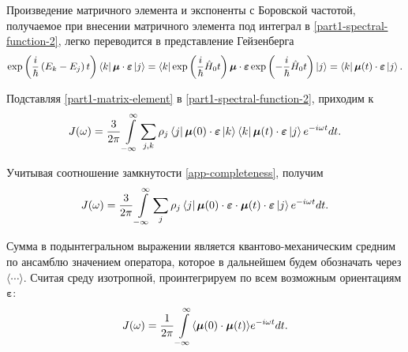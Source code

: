 Произведение матричного элемента и экспоненты с Боровской частотой, получаемое при внесении матричного элемента под интеграл в \eqref{part1-spectral-function-2}, легко переводится в представление Гейзенберга
\begin{gather}
    \exp \left( \frac{i}{\hbar} \left( E_k - E_j \right) t \right) \bra{k} \boldsymbol{\mu} \cdot \boldsymbol{\varepsilon} \ket{j} = \bra{k} \exp \left( \frac{i}{\hbar} \hat{H}_0 t \right) \boldsymbol{\mu} \cdot \boldsymbol{\varepsilon} \exp \left( -\frac{i}{\hbar} \hat{H}_0 t \right) \ket{j} = \bra{k} \boldsymbol{\mu}(t) \cdot \boldsymbol{\varepsilon} \ket{j}. \label{part1-matrix-element}
\end{gather}

Подставляя \eqref{part1-matrix-element} в \eqref{part1-spectral-function-2}, приходим к
\begin{gather}
    J(\omega) = \frac{3}{2\pi} \int\limits_{-\infty}^\infty \sum_{j,k} \rho_j \bra{j} \boldsymbol{\mu}(0) \cdot \boldsymbol{\varepsilon} \ket{k} \bra{k} \boldsymbol{\mu}(t) \cdot \boldsymbol{\varepsilon} \ket{j} e^{-i \omega t} dt.
\end{gather}

Учитывая соотношение замкнутости \eqref{app-completeness}, получим
\begin{gather}
    J(\omega) = \frac{3}{2\pi} \int\limits_{-\infty}^\infty \sum_j  \rho_{j} \bra{j} \boldsymbol{\mu}(0) \cdot \boldsymbol{\varepsilon} \cdot \boldsymbol{\mu}(t) \cdot \boldsymbol{\varepsilon} \ket{j} e^{-i\omega t} dt.
\end{gather}

Сумма в подынтегральном выражении является квантово-механическим средним по ансамблю значением оператора, которое в дальнейшем будем обозначать через $\langle \cdots \rangle$. Считая среду изотропной, проинтегрируем по всем возможным ориентациям $\boldsymbol{\varepsilon}$:
\begin{gather}
    J(\omega) = \frac{1}{2\pi} \int\limits_{-\infty}^\infty \langle  \boldsymbol{\mu}(0) \cdot \boldsymbol{\mu}(t)  \rangle e^{-i \omega t} dt. \label{litreview-spectral-function1}
\end{gather}

